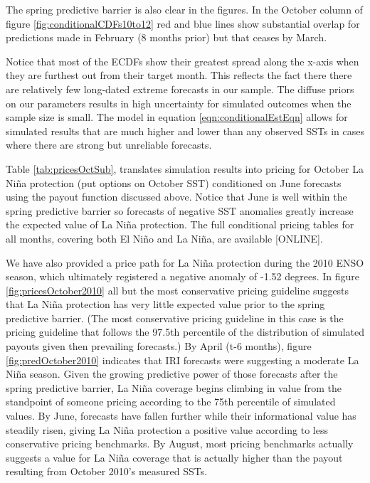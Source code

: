 \documentclass[authoryear]{article}
\begin{document}
The spring predictive barrier is also clear in the figures. In the October column of figure \ref{fig:conditionalCDFs10to12} red and blue lines show substantial overlap for predictions made in February (8 months prior) but that ceases by March.

Notice that most of the ECDFs show their greatest spread along the x-axis when they are furthest out from their target month. This reflects the fact there there are relatively few long-dated extreme forecasts in our sample. The diffuse priors on our parameters results in high uncertainty for simulated outcomes when the sample size is small. The model in equation \ref{eqn:conditionalEstEqn} allows for simulated results that are much higher and lower than any observed SSTs in cases where there are strong but unreliable forecasts.  



Table \ref{tab:pricesOctSub}, translates simulation results into pricing for October La Ni\~na protection (put options on October SST) conditioned on June forecasts using the payout function discussed above. Notice that June is well within the spring predictive barrier so forecasts of negative SST anomalies greatly increase the expected value of La Ni\~na protection. The full conditional pricing tables for all months, covering both El Ni\~no and La Ni\~na, are available [ONLINE].

We have also provided a price path for La Ni\~na protection during the 2010 ENSO season, which ultimately registered a negative anomaly of -1.52 degrees. In figure \ref{fig:pricesOctober2010} all but the most conservative pricing guideline suggests that La Ni\~na protection has very little expected value prior to the spring predictive barrier. (The most conservative pricing guideline in this case is the pricing guideline that follows the 97.5th percentile of the distribution of simulated payouts given then prevailing forecasts.) By April (t-6 months), figure \ref{fig:predOctober2010} indicates that IRI forecasts were suggesting a moderate La Ni\~na season. Given the growing predictive power of those forecasts after the spring predictive barrier, La Ni\~na coverage begins climbing in value from the standpoint of someone pricing according to the 75th percentile of simulated values. By June, forecasts have fallen further while their informational value has steadily risen, giving La Ni\~na protection a positive value according to less conservative pricing benchmarks. By August, most pricing benchmarks actually suggests a value for La Ni\~na coverage that is actually higher than the payout resulting from October 2010's measured SSTs.
\end{document}
